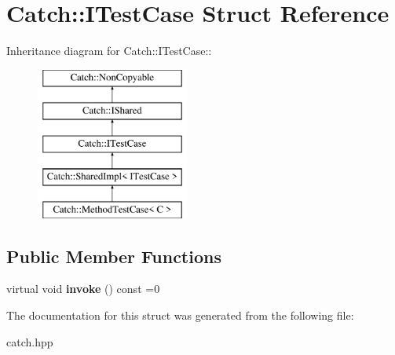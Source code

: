 \hypertarget{structCatch_1_1ITestCase}{
\section{Catch::ITestCase Struct Reference}
\label{structCatch_1_1ITestCase}
}
Inheritance diagram for Catch::ITestCase::\begin{figure}[H]
\begin{center}
\leavevmode
\includegraphics[height=5cm]{structCatch_1_1ITestCase}
\end{center}
\end{figure}
\subsection*{Public Member Functions}
\begin{DoxyCompactItemize}
\item 
\hypertarget{structCatch_1_1ITestCase_a678825e62e7c17297621cfeb65588c34}{
virtual void {\bfseries invoke} () const =0}
\label{structCatch_1_1ITestCase_a678825e62e7c17297621cfeb65588c34}

\end{DoxyCompactItemize}


The documentation for this struct was generated from the following file:\begin{DoxyCompactItemize}
\item 
catch.hpp\end{DoxyCompactItemize}
